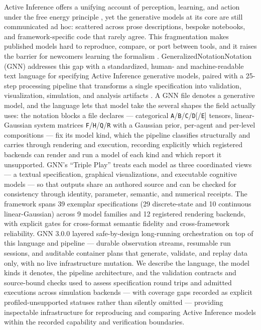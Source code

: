 \documentclass[
  english,
  9pt,
]{extarticle}
\begin{document}
Active Inference offers a unifying account of perception, learning, and
action under the free energy principle \citep{friston2010}, yet the
generative models at its core are still communicated ad hoc: scattered
across prose descriptions, bespoke notebooks, and framework-specific
code that rarely agree. This fragmentation makes published models hard
to reproduce, compare, or port between tools, and it raises the barrier
for newcomers learning the formalism \citep{parr2022}.
GeneralizedNotationNotation (GNN) addresses this gap with a
standardized, human- and machine-readable text language for specifying
Active Inference generative models, paired with a 25-step processing
pipeline that transforms a single specification into validation,
visualization, simulation, and analysis artifacts \citep{gnn2023}. A GNN
file denotes a generative model, and the language lets that model take
the several shapes the field actually uses: the notation blocks a file
declares --- categorical
\texttt{A}/\texttt{B}/\texttt{C}/\texttt{D}{[}/\texttt{E}{]} tensors,
linear-Gaussian system matrices
\texttt{F}/\texttt{H}/\texttt{Q}/\texttt{R} with a Gaussian prior,
per-agent and per-level compositions --- fix its model kind, which the
pipeline classifies structurally and carries through rendering and
execution, recording explicitly which registered backends can render and
run a model of each kind and which report it unsupported. GNN's ``Triple
Play'' treats each model as three coordinated views --- a textual
specification, graphical visualizations, and executable cognitive models
--- so that outputs share an authored source and can be checked for
consistency through identity, parameter, semantic, and numerical
receipts. The framework spans 39 exemplar specifications (29
discrete-state and 10 continuous linear-Gaussian) across 9 model
families and 12 registered rendering backends, with explicit gates for
cross-format semantic fidelity and cross-framework reliability. GNN
3.0.0 layered safe-by-design long-running orchestration on top of this
language and pipeline --- durable observation streams, resumable run
sessions, and auditable container plans that generate, validate, and
replay data only, with no live infrastructure mutation. We describe the
language, the model kinds it denotes, the pipeline architecture, and the
validation contracts and source-bound checks used to assess
specification round trips and admitted executions across simulation
backends --- with coverage gaps recorded as explicit
profiled-unsupported statuses rather than silently omitted --- providing
inspectable infrastructure for reproducing and comparing Active
Inference models within the recorded capability and verification
boundaries.
\end{document}
